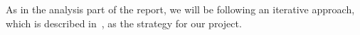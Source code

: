 As in the analysis part of the report, we will be following an iterative approach, which is described in~\cite{mathiassen2001objektorienteret}, as the strategy for our project.